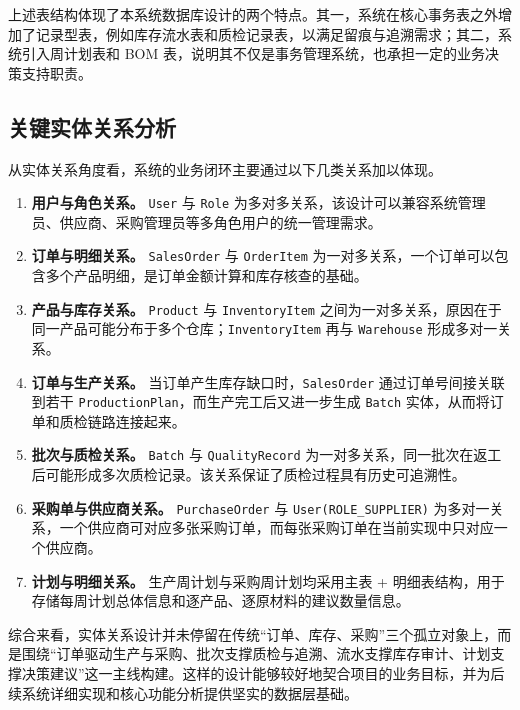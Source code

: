 上述表结构体现了本系统数据库设计的两个特点。其一，系统在核心事务表之外增加了记录型表，例如库存流水表和质检记录表，以满足留痕与追溯需求；其二，系统引入周计划表和 BOM 表，说明其不仅是事务管理系统，也承担一定的业务决策支持职责。

\subsection{关键实体关系分析}

从实体关系角度看，系统的业务闭环主要通过以下几类关系加以体现。

\begin{enumerate}
  \item \textbf{用户与角色关系。} \texttt{User} 与 \texttt{Role} 为多对多关系，该设计可以兼容系统管理员、供应商、采购管理员等多角色用户的统一管理需求。
  \item \textbf{订单与明细关系。} \texttt{SalesOrder} 与 \texttt{OrderItem} 为一对多关系，一个订单可以包含多个产品明细，是订单金额计算和库存核查的基础。
  \item \textbf{产品与库存关系。} \texttt{Product} 与 \texttt{InventoryItem} 之间为一对多关系，原因在于同一产品可能分布于多个仓库；\texttt{InventoryItem} 再与 \texttt{Warehouse} 形成多对一关系。
  \item \textbf{订单与生产关系。} 当订单产生库存缺口时，\texttt{SalesOrder} 通过订单号间接关联到若干 \texttt{ProductionPlan}，而生产完工后又进一步生成 \texttt{Batch} 实体，从而将订单和质检链路连接起来。
  \item \textbf{批次与质检关系。} \texttt{Batch} 与 \texttt{QualityRecord} 为一对多关系，同一批次在返工后可能形成多次质检记录。该关系保证了质检过程具有历史可追溯性。
  \item \textbf{采购单与供应商关系。} \texttt{PurchaseOrder} 与 \texttt{User(ROLE\_SUPPLIER)} 为多对一关系，一个供应商可对应多张采购订单，而每张采购订单在当前实现中只对应一个供应商。
  \item \textbf{计划与明细关系。} 生产周计划与采购周计划均采用主表 + 明细表结构，用于存储每周计划总体信息和逐产品、逐原材料的建议数量信息。
\end{enumerate}

综合来看，实体关系设计并未停留在传统“订单、库存、采购”三个孤立对象上，而是围绕“订单驱动生产与采购、批次支撑质检与追溯、流水支撑库存审计、计划支撑决策建议”这一主线构建。这样的设计能够较好地契合项目的业务目标，并为后续系统详细实现和核心功能分析提供坚实的数据层基础。

